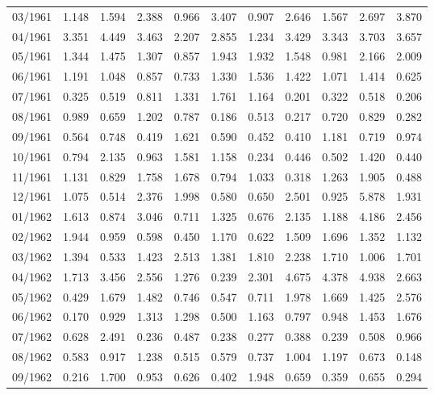 \begin{tabular}{lrrrrrrrrrr}
03/1961 &  1.148 &  1.594 &  2.388 &  0.966 &  3.407 &  0.907 &  2.646 &  1.567 &  2.697 &  3.870 \\
04/1961 &  3.351 &  4.449 &  3.463 &  2.207 &  2.855 &  1.234 &  3.429 &  3.343 &  3.703 &  3.657 \\
05/1961 &  1.344 &  1.475 &  1.307 &  0.857 &  1.943 &  1.932 &  1.548 &  0.981 &  2.166 &  2.009 \\
06/1961 &  1.191 &  1.048 &  0.857 &  0.733 &  1.330 &  1.536 &  1.422 &  1.071 &  1.414 &  0.625 \\
07/1961 &  0.325 &  0.519 &  0.811 &  1.331 &  1.761 &  1.164 &  0.201 &  0.322 &  0.518 &  0.206 \\
08/1961 &  0.989 &  0.659 &  1.202 &  0.787 &  0.186 &  0.513 &  0.217 &  0.720 &  0.829 &  0.282 \\
09/1961 &  0.564 &  0.748 &  0.419 &  1.621 &  0.590 &  0.452 &  0.410 &  1.181 &  0.719 &  0.974 \\
10/1961 &  0.794 &  2.135 &  0.963 &  1.581 &  1.158 &  0.234 &  0.446 &  0.502 &  1.420 &  0.440 \\
11/1961 &  1.131 &  0.829 &  1.758 &  1.678 &  0.794 &  1.033 &  0.318 &  1.263 &  1.905 &  0.488 \\
12/1961 &  1.075 &  0.514 &  2.376 &  1.998 &  0.580 &  0.650 &  2.501 &  0.925 &  5.878 &  1.931 \\
01/1962 &  1.613 &  0.874 &  3.046 &  0.711 &  1.325 &  0.676 &  2.135 &  1.188 &  4.186 &  2.456 \\
02/1962 &  1.944 &  0.959 &  0.598 &  0.450 &  1.170 &  0.622 &  1.509 &  1.696 &  1.352 &  1.132 \\
03/1962 &  1.394 &  0.533 &  1.423 &  2.513 &  1.381 &  1.810 &  2.238 &  1.710 &  1.006 &  1.701 \\
04/1962 &  1.713 &  3.456 &  2.556 &  1.276 &  0.239 &  2.301 &  4.675 &  4.378 &  4.938 &  2.663 \\
05/1962 &  0.429 &  1.679 &  1.482 &  0.746 &  0.547 &  0.711 &  1.978 &  1.669 &  1.425 &  2.576 \\
06/1962 &  0.170 &  0.929 &  1.313 &  1.298 &  0.500 &  1.163 &  0.797 &  0.948 &  1.453 &  1.676 \\
07/1962 &  0.628 &  2.491 &  0.236 &  0.487 &  0.238 &  0.277 &  0.388 &  0.239 &  0.508 &  0.966 \\
08/1962 &  0.583 &  0.917 &  1.238 &  0.515 &  0.579 &  0.737 &  1.004 &  1.197 &  0.673 &  0.148 \\
09/1962 &  0.216 &  1.700 &  0.953 &  0.626 &  0.402 &  1.948 &  0.659 &  0.359 &  0.655 &  0.294 \\

\end{tabular}
